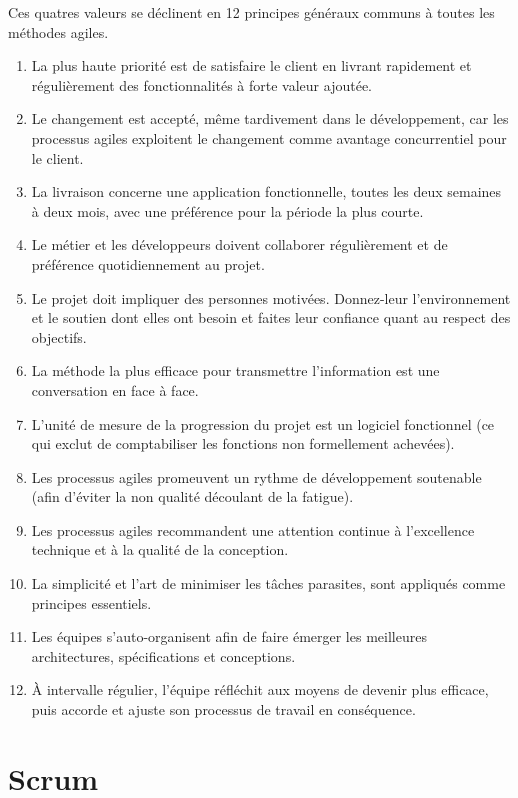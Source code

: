 Ces quatres valeurs se déclinent en 12 principes généraux communs à toutes les méthodes agiles. 
\begin{enumerate}
    \item  La plus haute priorité est de satisfaire le client en livrant rapidement et régulièrement des fonctionnalités à forte valeur ajoutée.
    \item Le changement est accepté, même tardivement dans le développement, car les processus agiles exploitent le changement comme avantage concurrentiel pour le client.
    \item La livraison concerne une application fonctionnelle, toutes les deux semaines à deux mois, avec une préférence pour la période la plus courte.
    \item Le métier et les développeurs doivent collaborer régulièrement et de préférence quotidiennement au projet.
    \item Le projet doit impliquer des personnes motivées. Donnez-leur l'environnement et le soutien dont elles ont besoin et faites leur confiance quant au respect des objectifs.
    \item La méthode la plus efficace pour transmettre l'information est une conversation en face à face.
    \item L’unité de mesure de la progression du projet est un logiciel fonctionnel (ce qui exclut de comptabiliser les fonctions non formellement achevées).
    \item Les processus agiles promeuvent un rythme de développement soutenable (afin d’éviter la non qualité découlant de la fatigue).
    \item Les processus agiles recommandent une attention continue à l'excellence technique et à la qualité de la conception.
    \item La simplicité et l'art de minimiser les tâches parasites, sont appliqués comme principes essentiels.
    \item Les équipes s'auto-organisent afin de faire émerger les meilleures architectures, spécifications et conceptions.
    \item À intervalle régulier, l'équipe réfléchit aux moyens de devenir plus efficace, puis accorde et ajuste son processus de travail en conséquence.
\end{enumerate}


\section{Scrum}

